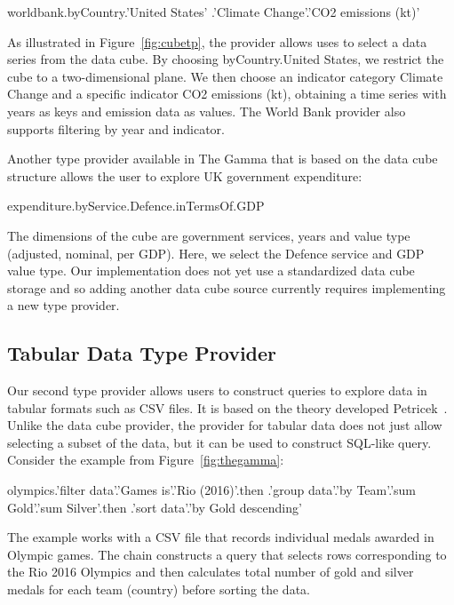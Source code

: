 \documentclass{sigchi}
\newcommand{\ikvd}[1]{{\fontfamily{zi4}\selectfont\small #1}}
\begin{document}
\begin{thegamma}
worldbank.byCountry.'United States'
  .'Climate Change'.'CO2 emissions (kt)'
\end{thegamma}

As illustrated in Figure~\ref{fig:cubetp}, the provider allows uses to select a data series
from the data cube. By choosing \ikvd{byCountry.\textquotesingle United States\textquotesingle},
we restrict the cube to a two-dimensional plane. We then choose an indicator category
\ikvd{\textquotesingle Climate Change\textquotesingle} and a specific indicator
\ikvd{\textquotesingle CO2 emissions (kt)\textquotesingle}, obtaining a time series with
years as keys and emission data as values. The World Bank provider also supports filtering
by year and indicator.

Another type provider available in The Gamma that is based on the data cube structure allows
the user to explore UK government expenditure:

\begin{thegamma}
expenditure.byService.Defence.inTermsOf.GDP
\end{thegamma}

The dimensions of the cube are government services, years and value type (adjusted, nominal,
per GDP). Here, we select the \ikvd{Defence} service and \ikvd{GDP} value type. Our implementation
does not yet use a standardized data cube storage and so adding another data cube source
currently requires implementing a new type provider.

\subsection{Tabular Data Type Provider}

Our second type provider allows users to construct queries to explore data in tabular formats
such as CSV files. It is based on the theory developed Petricek~\cite{dotdriven}. Unlike the
data cube provider, the provider for tabular data does not just allow selecting a subset of the
data, but it can be used to construct SQL-like query. Consider the example from Figure~\ref{fig:thegamma}:

\begin{thegamma}
olympics.'filter data'.'Games is'.'Rio (2016)'.then
  .'group data'.'by Team'.'sum Gold'.'sum Silver'.then
  .'sort data'.'by Gold descending'
\end{thegamma}

The example works with a CSV file that records individual medals awarded in Olympic games.
The chain constructs a query that selects rows corresponding to the Rio 2016 Olympics and then
calculates total number of gold and silver medals for each team (country) before sorting the data.
\end{document}
